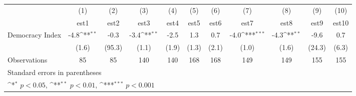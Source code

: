 {
\def\sym#1{\ifmmode^{#1}\else\(^{#1}\)\fi}
\begin{tabular}{l*{10}{c}}
\hline\hline
                    &\multicolumn{1}{c}{(1)}         &\multicolumn{1}{c}{(2)}         &\multicolumn{1}{c}{(3)}         &\multicolumn{1}{c}{(4)}         &\multicolumn{1}{c}{(5)}         &\multicolumn{1}{c}{(6)}         &\multicolumn{1}{c}{(7)}         &\multicolumn{1}{c}{(8)}         &\multicolumn{1}{c}{(9)}         &\multicolumn{1}{c}{(10)}         \\
                    &        est1         &        est2         &        est3         &        est4         &        est5         &        est6         &        est7         &        est8         &        est9         &       est10         \\
\hline
Democracy Index     &        -4.8\sym{**} &        -0.3         &        -3.4\sym{**} &        -2.5         &         1.3         &         0.7         &        -4.0\sym{***}&        -4.3\sym{**} &        -9.6         &         0.7         \\
                    &       (1.6)         &      (95.3)         &       (1.1)         &       (1.9)         &       (1.3)         &       (2.1)         &       (1.0)         &       (1.6)         &      (24.3)         &       (6.3)         \\
\hline
Observations        &          85         &          85         &         140         &         140         &         168         &         168         &         149         &         149         &         155         &         155         \\
\hline\hline
\multicolumn{11}{l}{\footnotesize Standard errors in parentheses}\\
\multicolumn{11}{l}{\footnotesize \sym{*} \(p<0.05\), \sym{**} \(p<0.01\), \sym{***} \(p<0.001\)}\\
\end{tabular}
}
